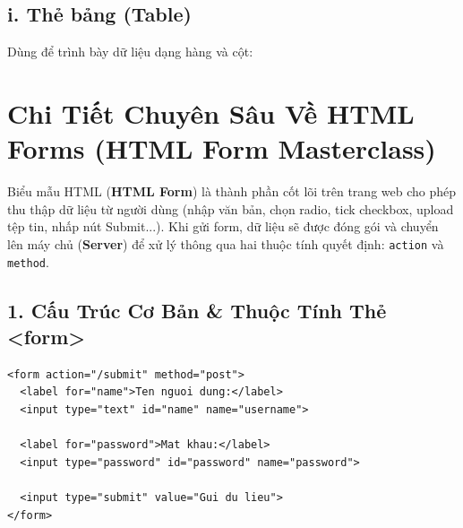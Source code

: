 \documentclass[11pt,oneside]{book}
\newcommand{\thd}[1]{\textcolor{white}{\textbf{\strut #1}}}
\newcommand{\codeinline}[1]{\textcolor{accentOrange}{\texttt{#1}}}
\newcommand{\term}[1]{\textbf{\textcolor{primaryBlue}{#1}}}
\begin{document}
\subsection{i. Thẻ bảng (Table)}
Dùng để trình bày dữ liệu dạng hàng và cột:
\begin{prettyTableBox}
\end{prettyTableBox}

\clearpage
\section{Chi Tiết Chuyên Sâu Về HTML Forms (HTML Form Masterclass)}

Biểu mẫu HTML (\term{HTML Form}) là thành phần cốt lõi trên trang web cho phép thu thập dữ liệu từ người dùng (nhập văn bản, chọn radio, tick checkbox, upload tệp tin, nhấp nút Submit...). Khi gửi form, dữ liệu sẽ được đóng gói và chuyển lên máy chủ (\term{Server}) để xử lý thông qua hai thuộc tính quyết định: \codeinline{action} và \codeinline{method}.

\subsection{1. Cấu Trúc Cơ Bản \& Thuộc Tính Thẻ <form>}

\begin{codeWindow}
\begin{lstlisting}[language=HTML5]
<form action="/submit" method="post">
  <label for="name">Ten nguoi dung:</label>
  <input type="text" id="name" name="username">
  
  <label for="password">Mat khau:</label>
  <input type="password" id="password" name="password">
  
  <input type="submit" value="Gui du lieu">
</form>
\end{lstlisting}
\end{codeWindow}
\end{document}
